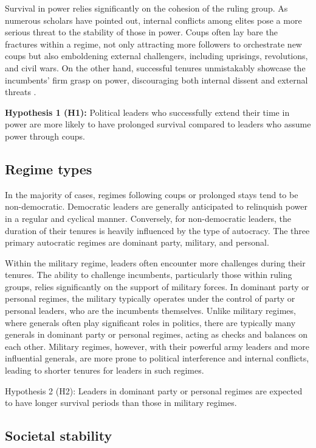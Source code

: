 \documentclass[
  12pt,
  a4paper,
  12pt]{article}
\begin{document}
Survival in power relies significantly on the cohesion of the ruling
group. As numerous scholars have pointed out, internal conflicts among
elites pose a more serious threat to the stability of those in power.
Coups often lay bare the fractures within a regime, not only attracting
more followers to orchestrate new coups but also emboldening external
challengers, including uprisings, revolutions, and civil wars. On the
other hand, successful tenures unmistakably showcase the incumbents'
firm grasp on power, discouraging both internal dissent and external
threats \citep{dahl2023}.

\textbf{Hypothesis 1 (H1):} Political leaders who successfully extend
their time in power are more likely to have prolonged survival compared
to leaders who assume power through coups.

\hypertarget{regime-types}{%
\subsection{Regime types}\label{regime-types}}

In the majority of cases, regimes following coups or prolonged stays
tend to be non-democratic. Democratic leaders are generally anticipated
to relinquish power in a regular and cyclical manner. Conversely, for
non-democratic leaders, the duration of their tenures is heavily
influenced by the type of autocracy. The three primary autocratic
regimes are dominant party, military, and personal.

Within the military regime, leaders often encounter more challenges
during their tenures. The ability to challenge incumbents, particularly
those within ruling groups, relies significantly on the support of
military forces. In dominant party or personal regimes, the military
typically operates under the control of party or personal leaders, who
are the incumbents themselves. Unlike military regimes, where generals
often play significant roles in politics, there are typically many
generals in dominant party or personal regimes, acting as checks and
balances on each other. Military regimes, however, with their powerful
army leaders and more influential generals, are more prone to political
interference and internal conflicts, leading to shorter tenures for
leaders in such regimes.

Hypothesis 2 (H2): Leaders in dominant party or personal regimes are
expected to have longer survival periods than those in military regimes.

\hypertarget{societal-stability}{%
\subsection{Societal stability}\label{societal-stability}}
\end{document}
